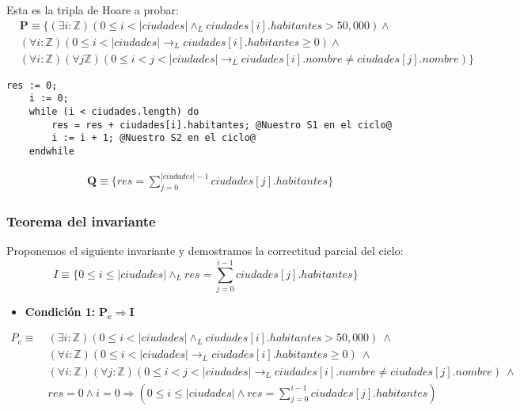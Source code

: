 \documentclass[10pt,a4paper]{article}
\begin{document}
Esta es la tripla de Hoare a probar:
\begin{equation*}
    \begin{split}
        &\textbf{P} \equiv \{(\exists i:\mathbb{Z})(0 \leq i < |ciudades| \land_L ciudades[i].habitantes > 50,000) \land \\
        &(\forall i : \mathbb{Z})(0 \leq i < |ciudades| \longrightarrow_L ciudades[i].habitantes \geq 0) \land\\
        &(\forall i :\mathbb{Z})(\forall j \mathbb{Z})(0 \leq i < j < |ciudades| \longrightarrow_L ciudades[i].nombre \ne ciudades[j].nombre)\}
    \end{split}
\end{equation*}
\begin{lstlisting}[style=base]
    res := 0;
    i := 0;
    while (i < ciudades.length) do 
        res = res + ciudades[i].habitantes; @Nuestro S1 en el ciclo@
        i := i + 1; @Nuestro S2 en el ciclo@
    endwhile
\end{lstlisting}
\begin{equation*}
    \begin{split}
        &\textbf{Q}\equiv \{res = \sum_{j = 0}^{|ciudades| - 1} ciudades[j].habitantes\}
    \end{split}
\end{equation*}


\subsubsection{Teorema del invariante}
Proponemos el siguiente invariante y demostramos la correctitud parcial del ciclo: 
\begin{equation*}
    I \equiv \{0 \leq i \leq |ciudades| \land_L res = \sum\limits_{j = 0}^{i - 1} ciudades[j].habitantes\}
\end{equation*}

\begin{itemize}
\item{\textbf{Condición 1:} $\mathbf{P_c \Rightarrow I}$} \\
\end{itemize}
\begin{equation*}
    \begin{split}
        P_c \equiv \ 
        &(\exists i:\mathbb{Z})(0 \leq i < |ciudades| \land_L ciudades[i].habitantes > 50,000) \ \land \\
        & (\forall i : \mathbb{Z})(0 \leq i < |ciudades| \longrightarrow_L ciudades[i].habitantes \geq 0) \ \land \\
        &(\forall i :\mathbb{Z})(\forall j : \mathbb{Z})(0 \leq i < j < |ciudades| \longrightarrow_L ciudades[i].nombre \ne ciudades[j].nombre) \ \land \\
        & res = 0 \land i = 0 \Longrightarrow (0 \leq i \leq |ciudades| \land res = \sum\limits_{j = 0} ^ {i - 1} ciudades[j].habitantes)
    \end{split}
\end{equation*}
\end{document}
